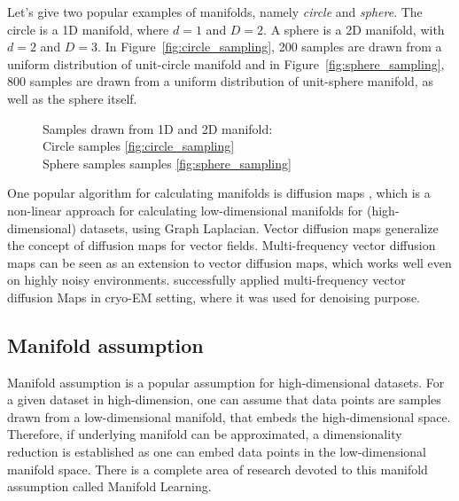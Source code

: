 Let's give two popular examples of manifolds, namely \textit{circle} and \textit{sphere}.
The circle is a 1D manifold, where $d=1$ and $D=2$. A sphere is a 2D manifold, with $d=2$ and $D=3$.
In Figure~\ref{fig:circle_sampling}, 200 samples are drawn from a uniform distribution of unit-circle manifold
and in Figure~\ref{fig:sphere_sampling}, 800 samples are drawn from a uniform distribution of unit-sphere manifold,
as well as the sphere itself.

\begin{figure}[H]
    \hfill
    \hfill
    \hfill
        \caption{Samples drawn from 1D and 2D manifold: \\
    Circle samples \ref{fig:circle_sampling} \\
    Sphere samples samples \ref{fig:sphere_sampling}}
\end{figure}

One popular algorithm for calculating manifolds is diffusion maps \cite{diffusionMaps}, 
which is a non-linear approach for calculating low-dimensional manifolds
for (high-dimensional) datasets, using Graph Laplacian.
Vector diffusion maps \cite{vectorDiffusionMaps} generalize the concept of diffusion maps for vector fields.
Multi-frequency vector diffusion maps \cite{multiDiffusionMaps} 
can be seen as an extension to vector diffusion maps, which works well even on highly noisy environments.
\citet{cryoEmMutliDM} successfully applied multi-frequency vector diffusion Maps in cryo-EM setting,
 where it was used for denoising purpose.

\subsection{Manifold assumption}
\label{sec:manifoldAssumption}
Manifold assumption is a popular assumption for high-dimensional datasets.
For a given dataset in high-dimension, one can assume that data points are samples drawn from a low-dimensional manifold,
that embeds the high-dimensional space. 
Therefore, if underlying manifold can be approximated, a dimensionality reduction
is established as one can embed data points in the low-dimensional manifold space.
There is a complete area of research devoted to this manifold assumption called Manifold Learning\cite{ManifoldLearning}.

